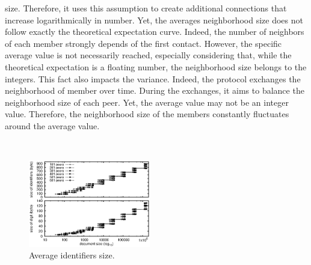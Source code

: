 \begin{asparadesc}
  size. Therefore, it uses this assumption to create additional connections that
  increase logarithmically in number. Yet, the averages neighborhood size does
  not follow exactly the theoretical expectation curve. Indeed, the number of
  neighbors of each member strongly depends of the first contact. However, the
  specific average value is not necessarily reached, especially considering
  that, while the theoretical expectation is a floating number, the neighborhood
  size belongs to the integers. This fact also impacts the variance. Indeed, the
  \SPRAY protocol exchanges the neighborhood of member over time. During the
  exchanges, it aims to balance the neighborhood size of each peer. Yet, the
  average value may not be an integer value. Therefore, the neighborhood size of
  the members constantly fluctuates around the average value.
\end{asparadesc}

\ \\

\begin{figure}
  \centering
  \includegraphics[width=0.475\textwidth]{./img/identifiers.eps}
  \caption{\label{fig:identifiers} Average identifiers size.}
\end{figure}

